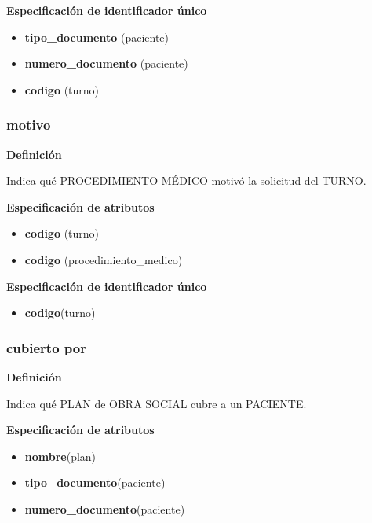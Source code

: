 \documentclass[a4paper,11pt]{article}
\begin{document}
\textbf{Especificación de identificador único}

\begin{itemize}

     \item \textbf{tipo\_documento} (paciente)

     \item \textbf{numero\_documento} (paciente)

     \item \textbf{codigo} (turno)

\end{itemize}



\subsubsection{\textbf{motivo}}

\textbf{Definición}

Indica qué PROCEDIMIENTO MÉDICO motivó la solicitud del TURNO.

\textbf{Especificación de atributos}


\begin{itemize}
     	\item \textbf{codigo} (turno)
	\item \textbf{codigo} (procedimiento\_medico)

\end{itemize}

\textbf{Especificación de identificador único}

\begin{itemize}

     \item \textbf{codigo}(turno)

\end{itemize}

\subsubsection{\textbf{cubierto por}}

\textbf{Definición}

Indica qué PLAN de OBRA SOCIAL cubre a un PACIENTE.

\textbf{Especificación de atributos}

\begin{itemize}
	\item \textbf{nombre}(plan)
	
	\item \textbf{tipo\_documento}(paciente)	

     \item \textbf{numero\_documento}(paciente)
\end{itemize}
\end{document}
